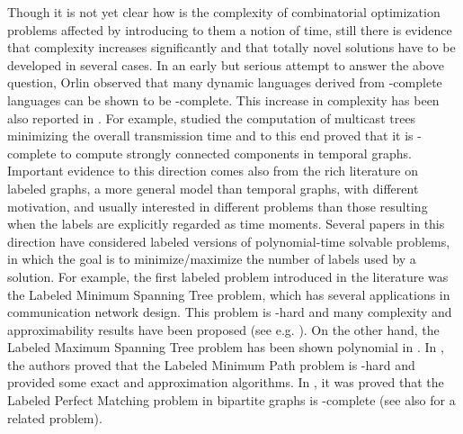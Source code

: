 \documentclass[oribibl, 11pt]{llncs}
\begin{document}
Though it is not yet clear how is the complexity of combinatorial optimization problems affected by introducing to them a notion of time, still there is evidence that complexity increases significantly and that totally novel solutions have to be developed in several cases. In an early but serious attempt to answer the above question, Orlin \cite{Or81} observed that many dynamic languages derived from -complete languages can be shown to be -complete. This increase in complexity has been also reported in \cite{BF03,XFJ03}. For example, \cite{BF03} studied the computation of multicast trees minimizing the overall transmission time and to this end proved that it is -complete to compute strongly connected components in temporal graphs. Important evidence to this direction comes also from the rich literature on labeled graphs, a more general model than temporal graphs, with different motivation, and usually interested in different problems than those resulting when the labels are explicitly regarded as time moments. Several papers in this direction have considered labeled versions of polynomial-time solvable problems, in which the goal is to minimize/maximize the number of labels used by a solution. For example, the first labeled problem introduced in the literature was the {\sc Labeled Minimum Spanning Tree} problem, which has several applications in communication network design. This problem is -hard and many complexity and approximability results have been proposed (see e.g. \cite{BL97,KW98}). On the other hand, the {\sc Labeled Maximum Spanning Tree} problem has been shown polynomial in \cite{BL97}. In \cite{BLWZ05}, the authors proved that the {\sc Labeled Minimum Path} problem is -hard and provided some exact and approximation algorithms. In \cite{Mo05}, it was proved that the {\sc Labeled Perfect Matching} problem in bipartite graphs is -complete (see also \cite{TIR78} for a related problem). 
\end{document}
